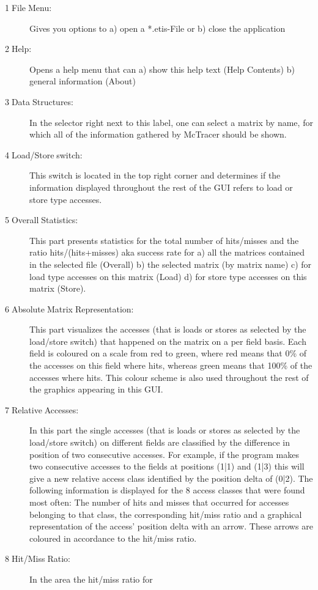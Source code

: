 \begin{description}
\item [{1$\;$File$\;$Menu:}] Gives you options to a) open a {*}.etis-File
or b) close the application
\item [{2$\;$Help:}] Opens a help menu that can a) show this help text
(Help Contents) b) general information (About)
\item [{3$\;$Data$\;$Structures:}] In the selector right next to this
label, one can select a matrix by name, for which all of the information
gathered by McTracer should be shown.
\item [{4$\;$Load/Store$\;$switch:}] This switch is located in the top
right corner and determines if the information displayed throughout
the rest of the GUI refers to load or store type accesses.
\item [{5$\;$Overall$\;$Statistics:}] This part presents statistics for
the total number of hits/misses and the ratio hits/(hits+misses) aka
success rate for a) all the matrices contained in the selected file
(Overall) b) the selected matrix (by matrix name) c) for load type
accesses on this matrix (Load) d) for store type accesses on this
matrix (Store).
\item [{6$\;$Absolute$\;$Matrix$\;$Representation:}] This part visualizes
the accesses (that is loads or stores as selected by the load/store
switch) that happened on the matrix on a per field basis. Each field
is coloured on a scale from red to green, where red means that 0\%
of the accesses on this field where hits, whereas green means that
100\% of the accesses where hits. This colour scheme is also used
throughout the rest of the graphics appearing in this GUI.
\item [{7$\;$Relative$\;$Accesses:}] In this part the single accesses
(that is loads or stores as selected by the load/store switch) on
different fields are classified by the difference in position of two
consecutive accesses. For example, if the program makes two consecutive
accesses to the fields at positions (1|1) and (1|3) this will give
a new relative access class identified by the position delta of (0|2).
The following information is displayed for the 8 access classes that
were found most often: The number of hits and misses that occurred
for accesses belonging to that class, the corresponding hit/miss ratio
and a graphical representation of the access' position delta with
an arrow. These arrows are coloured in accordance to the hit/miss
ratio. 
\item [{8$\;$Hit/Miss$\;$Ratio:}] In the area the hit/miss ratio for

\end{description}
